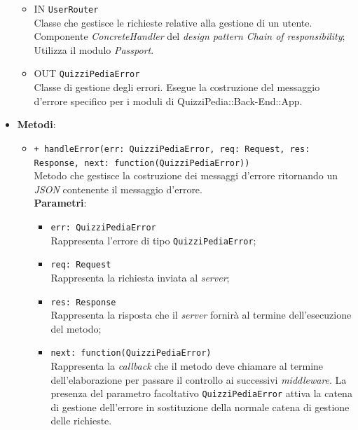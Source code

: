\begin{itemize}
\begin{itemize}
		\item IN \texttt{UserRouter}\\
		Classe che gestisce le richieste relative alla gestione di un utente. Componente \textit{ConcreteHandler} del \textit{design pattern} \textit{Chain of responsibility}; Utilizza il modulo \textit{Passport}.
		\item OUT \texttt{QuizziPediaError}\\
		Classe di gestione degli errori. Esegue la costruzione del messaggio d'errore specifico per i moduli di QuizziPedia::Back-End::App.
	\end{itemize}
	\item \textbf{Metodi}:\\
	\begin{itemize}
		\item \texttt{+ handleError(err: QuizziPediaError, req: Request, res: Response, next: function(QuizziPediaError))}\\
		Metodo che gestisce la costruzione dei messaggi d'errore ritornando un \textit{JSON} contenente il messaggio d'errore.\\
		\textbf{Parametri}:
		\begin{itemize}
			\item \texttt{err: QuizziPediaError}\\
			Rappresenta l'errore di tipo \texttt{QuizziPediaError};
			\item \texttt{req: Request}\\
			Rappresenta la richiesta inviata al \textit{server};
			\item \texttt{res: Response}\\
			Rappresenta la risposta che il \textit{server} fornirà al termine dell'esecuzione del metodo;
			\item \texttt{next: function(QuizziPediaError)}\\
			Rappresenta la \textit{callback} che il metodo deve chiamare al termine dell'elaborazione per passare il controllo ai successivi \textit{middleware}. La presenza del parametro facoltativo \texttt{QuizziPediaError} attiva la catena di gestione dell'errore in sostituzione della normale catena di gestione delle richieste.
		\end{itemize}
	\end{itemize}
\end{itemize}

